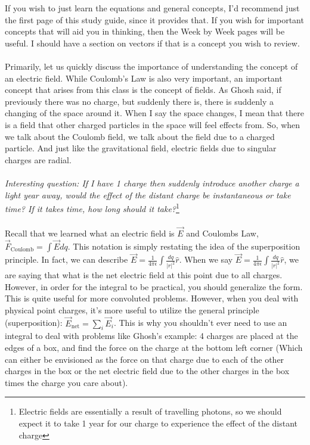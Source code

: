 \documentclass{article}
\begin{document}
If you wish to just learn the equations and general concepts, I'd recommend just the first page of this study guide, since it provides that. If you wish for important concepts that will aid you in thinking, then the Week by Week pages will be useful. I should have a section on vectors if that is a concept you wish to review. \\
\\
Primarily, let us quickly discuss the importance of understanding the concept of an electric field. While Coulomb's Law is also very important, an important concept that arises from this class is the concept of fields. As Ghosh said, if previously there was no charge, but suddenly there is, there is suddenly a changing of the space around it. When I say the space changes, I mean that there is a field that other charged particles in the space will feel effects from. So, when we talk about the Coulomb field, we talk about the field due to a charged particle. And just like the gravitational field, electric fields due to singular charges are radial.\\
\\
\textit{Interesting question: If I have 1 charge then suddenly introduce another charge a light year away, would the effect of the distant charge be instantaneous or take time? If it takes time, how long should it take?}\footnote{Electric fields are essentially a result of travelling photons, so we should expect it to take 1 year for our charge to experience the effect of the distant charge}\\
\\
Recall that we learned what an electric field is $\vec{E}$ and Coulombs Law, $\vec{F}_{\text{Coulomb}} = \int \vec{E} dq$. This notation is simply restating the idea of the superposition principle. In fact, we can describe $\vec{E} = \frac{1}{4\pi\epsilon} \int \frac{dq}{|r|^2} \hat{r}$. When we say  $\vec{E} = \frac{1}{4\pi\epsilon} \int \frac{dq}{|r|^2}\hat{r}$, we are saying that what is the net electric field at this point due to all charges. However, in order for the integral to be practical, you should generalize the form. This is quite useful for more convoluted problems. However, when you deal with physical point charges, it's more useful to utilize the general principle (superposition): $\vec{E}_{\text{net}} = \sum\limits_{i} \vec{E}_i$. This is why you shouldn't ever need to use an integral to deal with problems like Ghosh's example: 4 charges are placed at the edges of a box, and find the force on the charge at the bottom left corner (Which can either be envisioned as the force on that charge due to each of the other charges in the box or the net electric field due to the other charges in the box times the charge you care about).\\
\end{document}
